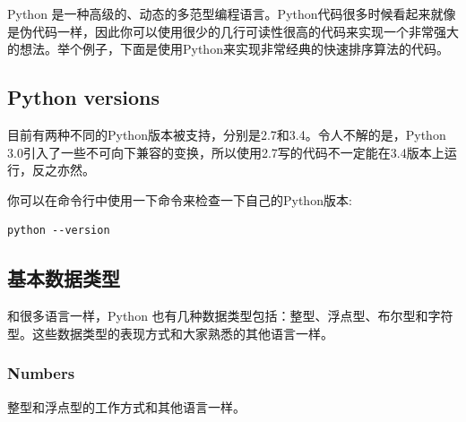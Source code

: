 \documentclass[10pt,a4paper]{article}
\begin{document}
Python 是一种高级的、动态的多范型编程语言。Python代码很多时候看起来就像是伪代码一样，因此你可以使用很少的几行可读性很高的代码来实现一个非常强大的想法。举个例子，下面是使用Python来实现非常经典的快速排序算法的代码。



\subsection{Python versions}

%


目前有两种不同的Python版本被支持，分别是2.7和3.4。令人不解的是，Python 3.0引入了一些不可向下兼容的变换，所以使用2.7写的代码不一定能在3.4版本上运行，反之亦然。%

你可以在命令行中使用一下命令来检查一下自己的Python版本:

\begin{lstlisting}
python --version
\end{lstlisting}



\subsection{基本数据类型}

%
%

和很多语言一样，Python 也有几种数据类型包括：整型、浮点型、布尔型和字符型。这些数据类型的表现方式和大家熟悉的其他语言一样。


\subsubsection{Numbers}
整型和浮点型的工作方式和其他语言一样。



%
\end{document}

